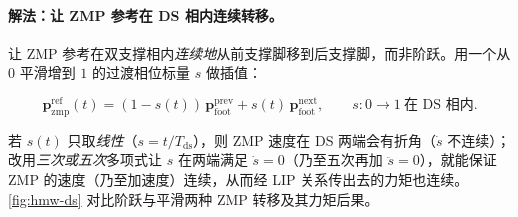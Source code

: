 \paragraph{解法：让 ZMP 参考在 DS 相内连续转移。}
让 ZMP 参考在双支撑相内\emph{连续地}从前支撑脚移到后支撑脚，而非阶跃。用一个从 $0$ 平滑增到 $1$ 的过渡相位标量 $s$ 做插值：

\begin{equation}
  \boxed{\;\mathbf p_{\mathrm{zmp}}^{\mathrm{ref}}(t)=(1-s(t))\,\mathbf p_{\mathrm{foot}}^{\mathrm{prev}}+s(t)\,\mathbf p_{\mathrm{foot}}^{\mathrm{next}},\qquad s:0\to 1\ \text{在 DS 相内}.\;}
  \label{eq:hmw-ds-zmp}
\end{equation}

若 $s(t)$ 只取\emph{线性}（$s=t/T_{\mathrm{ds}}$），则 ZMP 速度在 DS 两端会有折角（$\dot s$ 不连续）；改用\emph{三次或五次}多项式让 $s$ 在两端满足 $\dot s=0$（乃至五次再加 $\ddot s=0$），就能保证 ZMP 的速度（乃至加速度）连续，从而经 LIP 关系传出去的力矩也连续。\cref{fig:hmw-ds} 对比阶跃与平滑两种 ZMP 转移及其力矩后果。

